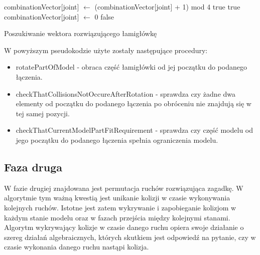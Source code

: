 {\small
	\begin{pseudokod}[H]
	{
		{
			combinationVector[joint] $\leftarrow$ (combinationVector[joint] + 1) mod 4\;
			\;
			{
				{
					{
						\Return true
					}
					{
						{
							\Return true
						}
					}
				}
			}
		}
		combinationVector[joint] $\leftarrow$ 0\;
		\Return false
	}
	\caption{Poszukiwanie wektora rozwiązującego łamigłówkę}\label{alg:mine}
	\end{pseudokod}
}

W powyższym pseudokodzie użyte zostały następujące procedury:
\begin{itemize}
\item rotatePartOfModel - obraca część łamigłówki od jej początku do podanego łączenia.
\item checkThatCollisionsNotOccureAfterRotation - sprawdza czy żadne dwa elementy od początku do podanego łączenia po obróceniu nie znajdują się w tej samej pozycji.
\item checkThatCurrentModelPartFitRequirement - sprawdza czy część modelu od jego początku do podanego łączenia spełnia ograniczenia modelu.
\end{itemize}

\clearpage 

\subsection{Faza druga}

W fazie drugiej znajdowana jest permutacja ruchów rozwiązująca zagadkę. W algorytmie tym ważną kwestią jest unikanie kolizji w czasie wykonywania kolejnych ruchów. Istotne jest zatem wykrywanie i zapobieganie kolizjom w każdym stanie modelu oraz w fazach przejścia między kolejnymi stanami. Algorytm wykrywający kolizje w czasie danego ruchu opiera swoje działanie o szereg działań algebraicznych, których skutkiem jest odpowiedź na pytanie, czy w czasie wykonania danego ruchu nastąpi kolizja.

